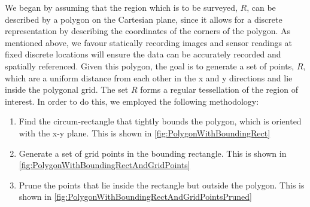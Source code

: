 We began by assuming that the region which is to be surveyed, $R$, can be described by a polygon on the Cartesian plane, since it allows for a discrete representation by describing the coordinates of the corners of the polygon. As mentioned above, we favour statically recording images and sensor readings at fixed discrete locations will ensure the data can be accurately recorded and spatially referenced. Given this polygon, the goal is to generate a set of points, $R$, which are a uniform distance from each other in the x and y directions and lie inside the polygonal grid. The set $R$ forms a regular tessellation of the region of interest. In order to do this, we employed the following methodology:
\begin{enumerate}
    \item Find the circum-rectangle that tightly bounds the polygon, which is oriented with the x-y plane. This is shown in \ref{fig:PolygonWithBoundingRect}
    \item Generate a set of grid points in the bounding rectangle. This is shown in \ref{fig:PolygonWithBoundingRectAndGridPoints}
    \item Prune the points that lie inside the rectangle but outside the polygon. This is shown in \ref{fig:PolygonWithBoundingRectAndGridPointsPruned}
\end{enumerate}


